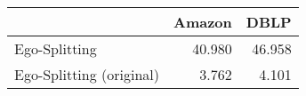 \begin{tabular}{lrr}
\toprule
{} & Amazon &   DBLP \\
\midrule
Ego-Splitting            & 40.980 & 46.958 \\
Ego-Splitting (original) &  3.762 &  4.101 \\
\bottomrule
\end{tabular}
